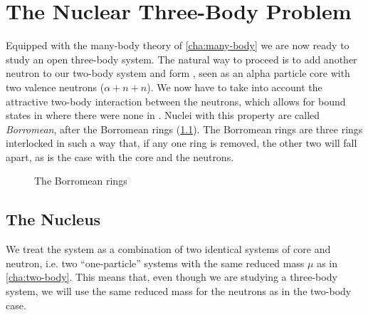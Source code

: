 \documentclass[../main/report.tex]{subfiles}
\begin{document}
\chapter{The Nuclear Three-Body Problem}
\label{cha:three-body}


Equipped with the many-body theory of \cref{cha:many-body} we are now ready to study an open three-body system.
The natural way to proceed is to add another neutron to our two-body  system and form , seen as an alpha particle core with two valence neutrons ($\alpha + n + n$).
We now have to take into account the attractive two-body interaction between the neutrons, which allows for bound states in  where there were none in .
Nuclei with this property are called \emph{Borromean}, after the Borromean rings (\cref{fig:borromean}). 
The Borromean rings are three rings interlocked in such a way that, if any one ring is removed, the other two will fall apart, as is the case with the core and the neutrons.

\begin{figure}[h]
  \newcommand{\circdist}{1.2}
  \newcommand{\circrad}{2}
  \centering
  \caption{The Borromean rings}
  \label{fig:borromean}
\end{figure}

\section{The  Nucleus}
 
We treat the  system as a combination of two identical  systems of core and neutron, i.e. two ``one-particle'' systems with the same reduced mass $\mu$ as in \cref{cha:two-body}.
This means that, even though we are studying a three-body system, we will use the same reduced mass for the neutrons as in the two-body case.
\end{document}
